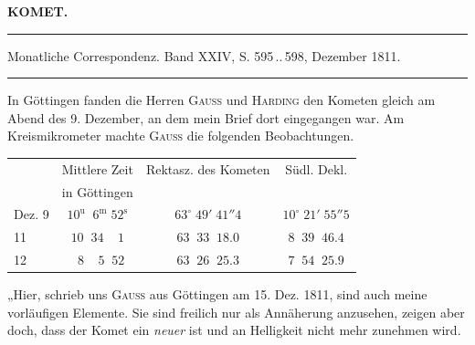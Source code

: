 \clearpage{}\hypertarget{native-348-lower}{}\label{native-348-lower}
\begin{center}\textbf{KOMET.}\par\vspace{4pt}\hrule\vspace{4pt}\fontsize{10}{12}\selectfont Monatliche Correspondenz. Band XXIV, S. 595\,..\,598, Dezember 1811.\par\vspace{4pt}\hrule\vspace{4pt}\end{center}

\par\indent In Göttingen fanden die Herren \textsc{Gauß} und \textsc{Harding} den Kometen gleich am Abend des 9. Dezember, an dem mein Brief dort eingegangen war. Am Kreismikrometer machte \textsc{Gauß} die folgenden Beobachtungen.

\begin{center}
\fontsize{10}{12}\selectfont\setlength{\tabcolsep}{4pt}\renewcommand{\arraystretch}{1.15}\begin{tabular}{l|c|c|c}
 & Mittlere Zeit & Rektasz. des Kometen & Südl. Dekl. \\
 & in Göttingen & & \\ \hline
Dez. 9 & $10^{\mathrm u}\;\;6^{\mathrm m}\;52^{\mathrm s}$ & $63^\circ\;49'\;41''4$ & $10^\circ\;21'\;55''5$ \\
11 & $10\;\;34\;\;\;\;1$ & $63\;\;33\;\;18.0$ & $8\;\;39\;\;46.4$ \\
12 & $\;\;8\;\;\;\;5\;\;52$ & $63\;\;26\;\;25.3$ & $7\;\;54\;\;25.9$ \\
\end{tabular}
\end{center}

\par\indent „Hier, schrieb uns \textsc{Gauß} aus Göttingen am 15. Dez. 1811, sind auch meine vorläufigen Elemente. Sie sind freilich nur als Annäherung anzusehen, zeigen aber doch, dass der Komet ein \emph{neuer} ist und an Helligkeit nicht mehr zunehmen wird.

